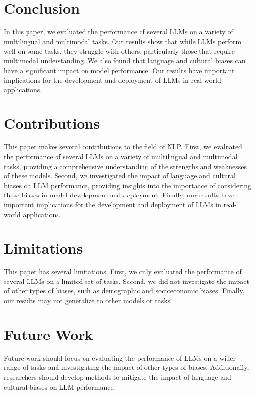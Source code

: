 \documentclass{article}
\begin{document}
\section{Conclusion}
In this paper, we evaluated the performance of several LLMs on a variety of multilingual and multimodal tasks. Our results show that while LLMs perform well on some tasks, they struggle with others, particularly those that require multimodal understanding. We also found that language and cultural biases can have a significant impact on model performance. Our results have important implications for the development and deployment of LLMs in real-world applications.

\section{Contributions}
This paper makes several contributions to the field of NLP. First, we evaluated the performance of several LLMs on a variety of multilingual and multimodal tasks, providing a comprehensive understanding of the strengths and weaknesses of these models. Second, we investigated the impact of language and cultural biases on LLM performance, providing insights into the importance of considering these biases in model development and deployment. Finally, our results have important implications for the development and deployment of LLMs in real-world applications.

\section{Limitations}
This paper has several limitations. First, we only evaluated the performance of several LLMs on a limited set of tasks. Second, we did not investigate the impact of other types of biases, such as demographic and socioeconomic biases. Finally, our results may not generalize to other models or tasks.

\section{Future Work}
Future work should focus on evaluating the performance of LLMs on a wider range of tasks and investigating the impact of other types of biases. Additionally, researchers should develop methods to mitigate the impact of language and cultural biases on LLM performance.
\end{document}
